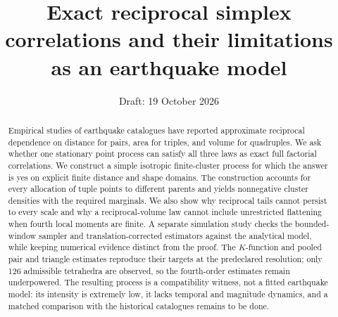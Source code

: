 \documentclass[11pt,a4paper]{article}
\title{Exact reciprocal simplex correlations and their limitations as an earthquake model}
\author{}
\date{Draft: 19 October 2026}
\theoremstyle{definition}
\theoremstyle{remark}
\newcommand{\1}{\mathbf 1}
\begin{document}
\maketitle

\begin{abstract}
Empirical studies of earthquake catalogues have reported approximate reciprocal dependence on distance for pairs, area for triples, and volume for quadruples. We ask whether one stationary point process can satisfy all three laws as exact full factorial correlations. We construct a simple isotropic finite-cluster process for which the answer is yes on explicit finite distance and shape domains. The construction accounts for every allocation of tuple points to different parents and yields nonnegative cluster densities with the required marginals. We also show why reciprocal tails cannot persist to every scale and why a reciprocal-volume law cannot include unrestricted flattening when fourth local moments are finite. A separate simulation study checks the bounded-window sampler and translation-corrected estimators against the analytical model, while keeping numerical evidence distinct from the proof. The $K$-function and pooled pair and triangle estimates reproduce their targets at the predeclared resolution; only 126 admissible tetrahedra are observed, so the fourth-order estimates remain underpowered. The resulting process is a compatibility witness, not a fitted earthquake model: its intensity is extremely low, it lacks temporal and magnitude dynamics, and a matched comparison with the historical catalogues remains to be done.
\end{abstract}










\appendix








\end{document}
